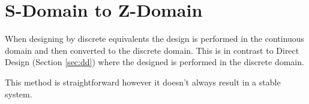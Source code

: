\documentclass{article}
\newcommand{\sincludepdf}[2][]{
	
}
\begin{document}
\section{S-Domain to Z-Domain}
\label{sec:mapping}

When designing by discrete equivalents the design is performed
in the continuous domain and then converted to the discrete domain.
This is in contrast to Direct Design (Section \ref{sec:dd}) where
the designed is performed in the discrete domain.

This method is straightforward however it doesn't always result in
a stable system.

\sincludepdf[pages={10},
		pagecommand=\subsection{Mapping: $z=e^{sT}$}\label{sec:mapzest}\subsubsection*{Example 1}
		]{scan/11221301.pdf}

\sincludepdf[pages={1},
			pagecommand=\subsubsection*{Example 2}
	]{scan/11231301.pdf}

\sincludepdf[pages={9},
			pagecommand=\subsection{Mapping: Forward, Backward, Trapezoid}\subsubsection*{Example 1}
	]{scan/11211301.pdf}

\sincludepdf[pages={10},
			pagecommand=\subsubsection*{Example 2}
	]{scan/11211301.pdf}

\sincludepdf[pages={8},
			pagecommand=\subsubsection*{Example 3}
		]{scan/11221301.pdf}
\end{document}
